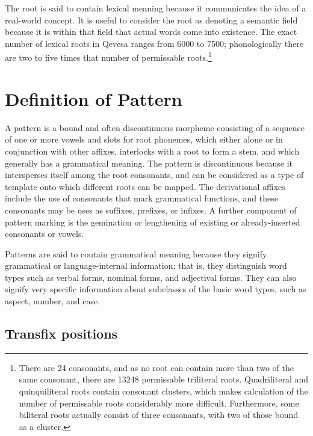 \documentclass[grammar]{subfiles}
\begin{document}
	The root is said to contain lexical meaning because it communicates the idea of a real-world concept. It is useful to consider the root as denoting a semantic field because it is within that field that actual words come into existence. The exact number of lexical roots in Qevesa ranges from 6000 to 7500; phonologically there are two to five times that number of permissable roots.\footnote{There are 24 consonants, and as no root can contain more than two of the same consonant, there are 13248\footnotemark{} permissable triliteral roots. Quadriliteral and quinquiliteral roots contain consonant clusters, which makes calculation of the number of permissable roots considerably more difficult. Furthermore, some biliteral roots actually consist of three consonants, with two of those bound as a cluster. }



	\section{Definition of Pattern}
	\label{sec:definition_of_pattern}

	A pattern is a bound and often discontinuous morpheme consisting of a sequence of one or more vowels and slots for root phonemes, which either alone or in conjunction with other affixes, interlocks with a root to form a stem, and which generally has a grammatical meaning. The pattern is discontinuous because it intersperses itself among the root consonants, and can be considered as a type of template onto which different roots can be mapped. The derivational affixes include the use of consonants that mark grammatical functions, and	these consonants may be uses as suffixes, prefixes, or infixes. A further component of pattern marking is the gemination or lengthening of existing or already-inserted consonants or vowels.

	Patterns are said to contain grammatical meaning because they signify grammatical or language-internal information; that is, they distinguish word types such as verbal forms, nominal forms, and adjectival forms. They can also signify very specific information about subclasses of the basic word types, such as aspect, number, and case.

	\subsection{Transfix positions}
	\label{ssec:transfix_positions}
\end{document}
